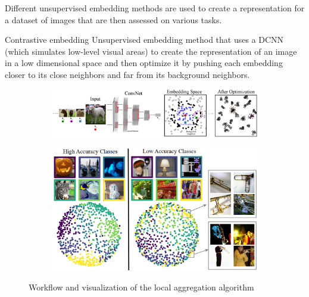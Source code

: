 \begin{casestudy}
    Different unsupervised embedding methods are used to create a representation for a dataset of images that are then assessed on various tasks.

    \begin{descriptionlist}
        \item[Contrastive embedding] 
            Unsupervised embedding method that uses a DCNN (which simulates low-level visual areas) to create the representation of an image in a low dimensional space and 
            then optimize it by pushing each embedding closer to its close neighbors and far from its background neighbors.
            \begin{figure}[H]
                \centering
                \begin{subfigure}{0.75\linewidth}
                    \centering
                    \includegraphics[width=\linewidth]{./img/local_aggregation1.png}
                \end{subfigure}
                \begin{subfigure}{0.55\linewidth}
                    \centering
                    \includegraphics[width=\linewidth]{./img/local_aggregation2.png}
                \end{subfigure}
                \caption{Workflow and visualization of the local aggregation algorithm}
            \end{figure}


\end{descriptionlist}
\end{casestudy}
